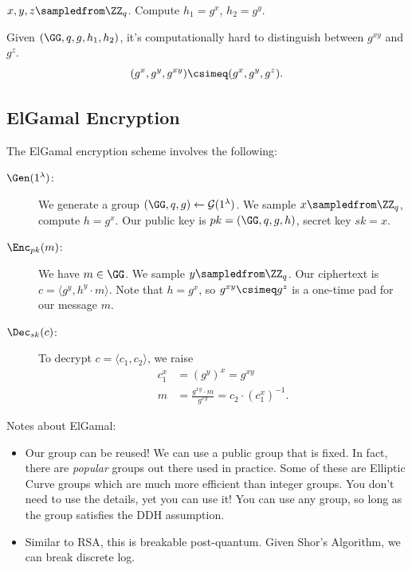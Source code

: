 \begin{definition}
    $x, y, z\sampledfrom \ZZ_q$. Compute $h_1 = g^x$, $h_2 = g^y$.

    Given $(\GG, q, g, h_1, h_2)$, it's computationally hard to distinguish between $g^{xy}$ and $g^z$.
    \[(g^x, g^y, g^{xy}) \csimeq (g^x, g^y, g^z).\]
\end{definition}

\subsection{ElGamal Encryption}
The ElGamal encryption scheme involves the following:
\begin{description}
    \item[$\Gen(1^\lambda)$:] We generate a group $(\GG, q, g) \leftarrow \mathcal{G}(1^\lambda)$. We sample $x\sampledfrom \ZZ_q$, compute $h = g^x$. Our public key is $pk = (\GG, q, g, h)$, secret key $sk = x$.
    \item[$\Enc_{pk}(m)$:] We have $m\in\GG$. We sample $y\sampledfrom \ZZ_q$. Our ciphertext is $c = \langle g^y, h^y\cdot m\rangle$. Note that $h = g^x$, so $g^{xy}\csimeq g^z$ is a one-time pad for our message $m$.
    \item[$\Dec_{sk}(c)$:] To decrypt $c = \langle c_1, c_2\rangle$, we raise
        \begin{align*}
            c_1^x & = (g^y)^x = g^{xy}                                      \\
            m     & = \frac{g^{xy}\cdot m}{g^{xy}} = c_2\cdot (c_1^x)^{-1}.
        \end{align*}
\end{description}

Notes about ElGamal:
\begin{itemize}
    \item Our group can be reused! We can use a public group that is fixed. In fact, there are \emph{popular} groups out there used in practice. Some of these are Elliptic Curve groups which are much more efficient than integer groups. You don't need to use the details, yet you can use it! You can use any group, so long as the group satisfies the DDH assumption.
    \item Similar to RSA, this is breakable post-quantum. Given Shor's Algorithm, we can break discrete log.
\end{itemize}

